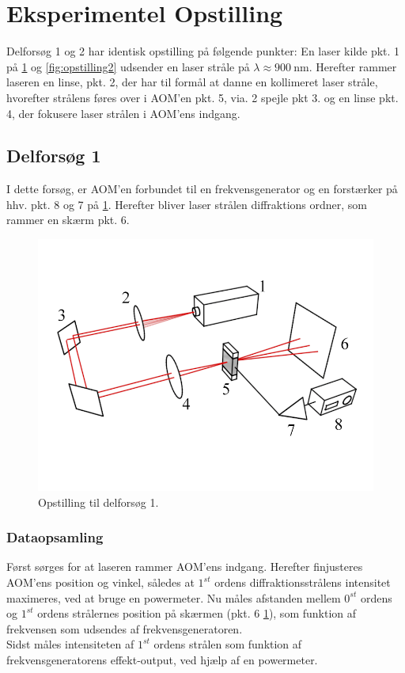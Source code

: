 \documentclass[main]{subfiles}
\begin{document}
\section{Eksperimentel Opstilling}
Delforsøg 1 og 2 har identisk opstilling på følgende punkter: En laser kilde pkt. 1 på \cref{fig:opstilling1} og \cref{fig:opstilling2} udsender en laser stråle på $\lambda \approx  \SI{900}{\nano\m} $. Herefter rammer laseren en linse, pkt. 2, der har til formål at danne en kollimeret laser stråle, hvorefter strålens føres over i AOM'en pkt. 5, via. 2 spejle pkt 3. og en linse pkt. 4, der fokusere laser strålen i AOM'ens indgang.

\subsection{Delforsøg 1}
I dette forsøg, er AOM'en forbundet til en frekvensgenerator og en forstærker på hhv. pkt. 8 og 7 på \cref{fig:opstilling1}. Herefter bliver laser strålen diffraktions ordner, som rammer en skærm pkt. 6.
\begin{figure}[H]
    \includegraphics[width=\linewidth]{tegninger/tegning1.png}
    \caption{Opstilling til delforsøg 1.}
    \label{fig:opstilling1}
\end{figure}

\subsubsection{Dataopsamling}
Først sørges for at laseren rammer AOM'ens indgang. Herefter finjusteres AOM'ens position og vinkel, således at $1^{st}$ ordens diffraktionsstrålens intensitet maximeres, ved at bruge en powermeter. Nu måles afstanden mellem $0^{st}$ ordens og $1^{st}$ ordens strålernes position på skærmen (pkt. 6 \cref{fig:opstilling1}), som funktion af frekvensen som udsendes af frekvensgeneratoren.
\\ Sidst måles intensiteten af $1^{st}$ ordens strålen som funktion af frekvensgeneratorens effekt-output, ved hjælp af en powermeter.
\end{document}

